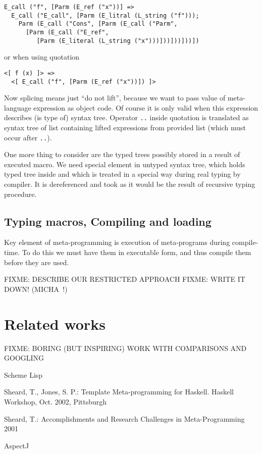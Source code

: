 \documentclass{llncs}
\begin{document}
\begin{verbatim}
E_call ("f", [Parm (E_ref ("x"))] =>
  E_call ("E_call", [Parm (E_litral (L_string ("f")));
    Parm (E_call ("Cons", [Parm (E_call ("Parm", 
      [Parm (E_call ("E_ref", 
         [Parm (E_literal (L_string ("x")))]))]))]))])
\end{verbatim}

or when using quotation

\begin{verbatim}
<[ f (x) ]> =>
  <[ E_call ("f", [Parm (E_ref ("x"))]) ]>
\end{verbatim}

Now splicing means just ``do not lift'', because we want to pass value of 
meta-language expression as object code. Of course it is only valid when this 
expression describes (is type of) syntax tree. Operator \verb,.., inside 
quotation is translated as syntax tree of list containing lifted expressions 
from provided list (which must occur after \verb,..,).

One more thing to consider are the typed trees possibly stored in a result
of executed macro. We need special element in untyped syntax tree, which
holds typed tree inside and which is treated in a special way during real
typing by compiler. It is dereferenced and took as it would be the result of 
recursive typing procedure. 

\subsection{Typing macros, Compiling and loading}
Key element of meta-programming is execution of meta-programs during compile-time.
To do this we must have them in executable form, and thus compile them before
they are used. 

FIXME: DESCRIBE OUR RESTRICTED APPROACH
FIXME: WRITE IT DOWN! (MICHA~!)

\section{Related works}
FIXME: BORING (BUT INSPIRING) WORK WITH COMPARISONS AND GOOGLING


%
%
\begin{thebibliography}{}
%
Scheme Lisp

Sheard, T., Jones, S. P.:
Template Meta-programming for Haskell.
Haskell Workshop, Oct. 2002, Pittsburgh

Sheard, T.:
Accomplishments and Research Challenges in Meta-Programming
2001

AspectJ

\end{thebibliography}
\end{document}
